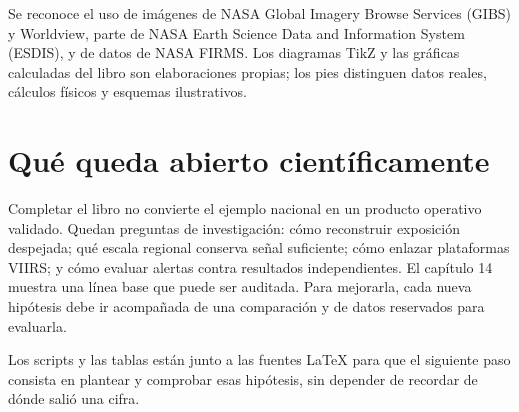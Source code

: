 Se reconoce el uso de imágenes de NASA Global Imagery Browse Services (GIBS) y Worldview,
parte de NASA Earth Science Data and Information System (ESDIS), y de datos de NASA FIRMS.
Los diagramas TikZ y las gráficas calculadas del libro son elaboraciones propias; los
pies distinguen datos reales, cálculos físicos y esquemas ilustrativos.

\section{Qué queda abierto científicamente}

Completar el libro no convierte el ejemplo nacional en un producto operativo validado.
Quedan preguntas de investigación: cómo reconstruir exposición despejada; qué escala
regional conserva señal suficiente; cómo enlazar plataformas VIIRS; y cómo evaluar
alertas contra resultados independientes. El capítulo 14 muestra una línea base que
puede ser auditada. Para mejorarla, cada nueva hipótesis debe ir acompañada de una
comparación y de datos reservados para evaluarla.

Los scripts y las tablas están junto a las fuentes LaTeX para que el siguiente paso
consista en plantear y comprobar esas hipótesis, sin depender de recordar de dónde
salió una cifra.
